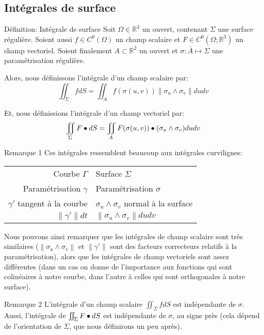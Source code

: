 \documentclass[a4paper]{article}
\begin{document}
\subsection{Intégrales de surface}
\begin{parag}{Définition: Intégrale de surface}
    Soit $\Omega \in \mathbb{R}^3$ un ouvert, contenant $\Sigma$ une surface régulière. Soient aussi $f \in C^0\left(\Omega\right)$ un champ scalaire et $F \in C^{0}\left(\Omega; \mathbb{R}^3\right)$ un champ vectoriel. Soient finalement $A \subset \mathbb{R}^2$ un ouvert et $\sigma: \bar{A} \mapsto \Sigma$ une paramétrisation régulière.

    Alors, nous définissons l'intégrale d'un champ scalaire par: 
    \[\iint_{\Sigma} f dS = \iint_{A} f\left(\sigma\left(u, v\right)\right) \left\|\sigma_{u} \wedge \sigma_v\right\| dudv\]
    
    Et, nous définissions l'intégrale d'un champ vectoriel par: 
    \[\iint_{\Sigma} F \dotprod dS = \iint_{A} F\left(\sigma\left(u, v\right)\right) \dotprod \left(\sigma_u \wedge \sigma_v\right) dudv\]
    
    \begin{subparag}{Remarque 1}
        Ces intégrales ressemblent beaucoup aux intégrales curvilignes:
        \begin{center}
        \begin{tabular}{rl}
            Courbe $\Gamma$ & Surface $\Sigma$ \\
            Paramétrisation $\gamma$ & Paramétrisation $\sigma$ \\
            $\gamma'$ tangent à la courbe & $\sigma_u \wedge \sigma_v$ normal à la surface \\
            $\left\|\gamma'\right\|dt$ & $\left\|\sigma_u \wedge \sigma_v\right\|dudv$  \\
        \end{tabular}
        \end{center}

        Nous pouvons ainsi remarquer que les intégrales de champ scalaire sont très similaires ($\left\|\sigma_u \wedge \sigma_v\right\|$ et $\left\|\gamma'\right\|$ sont des facteurs correcteurs relatifs à la paramétrisation), alors que les intégrales de champ vectoriels sont assez différentes (dans un cas on donne de l'importance aux fonctions qui sont colinéaires à notre courbe, dans l'autre à celles qui sont orthogonales à notre surface).
    \end{subparag}

    \begin{subparag}{Remarque 2}
        L'intégrale d'un champ scalaire $\iint_{\Sigma} f dS$ est indépendante de $\sigma$. Aussi, l'intégrale de $\iint_{\Sigma} F \bullet dS$ est indépendante de $\sigma$, au signe près (cela dépend de l'orientation de $\Sigma$, que nous définirons un peu après).
    \end{subparag}
\end{parag}
\end{document}
